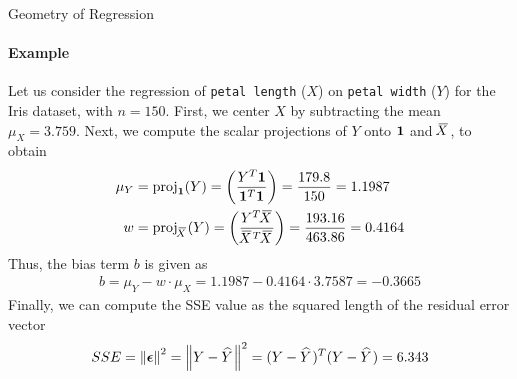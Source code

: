%
%
\begin{frame}{Geometry of Regression}
\framesubtitle{Example}
    Let us consider the regression of \texttt{petal length} ($X$) on 
    \texttt{petal width} ($Y$) for the Iris dataset, with $n=150$. 
    First,
    we center $X$ by subtracting the mean $\mu_X = 3.759$.
    Next, we compute the scalar projections of $Y$ onto $\mathbf{1}$ and $\mkern 1.5mu\overline{\mkern-4.0muX}\mkern 1.5mu$, 
    to obtain
    \begin{align*}
        \mu_Y & = \operatorname{proj}_{\mathbf{1}}(Y) = \left(\frac{Y^T \mathbf{1}}{\mathbf{1}^T\mathbf{1}} \right)
        = \frac{179.8}{150} = 1.1987\\
        w & = \operatorname{proj}_{\mkern 1.5mu\overline{\mkern-4.0muX}\mkern 1.5mu}(Y) = \left(\frac{Y^T \mkern 1.5mu\overline{\mkern-4.0muX}\mkern 1.5mu}{\mkern 1.5mu\overline{\mkern-4.0muX}\mkern 1.5mu^T \mkern 1.5mu\overline{\mkern-4.0muX}\mkern 1.5mu} \right) =
        \frac{193.16}{463.86} = 0.4164
    \end{align*}
    Thus, the bias term $b$ is given as
    \begin{align*}
        b = \mu_Y - w \cdot \mu_X = 1.1987 - 0.4164 \cdot 3.7587 =
        -0.3665
    \end{align*}
    Finally, we can compute the SSE value %
    as the squared length of the residual error vector
    \begin{align*}
        SSE = \left\lVert{\bm \epsilon}\right\rVert^2 = \left\lVert Y - \mkern 1.5mu\widehat{\mkern-1.5muY}\mkern 1.5mu\right\rVert^2 = (Y - \mkern 1.5mu\widehat{\mkern-1.5muY}\mkern 1.5mu)^T(Y-\mkern 1.5mu\widehat{\mkern-1.5muY}\mkern 1.5mu)
        = 6.343
    \end{align*}
\end{frame}
%
%
